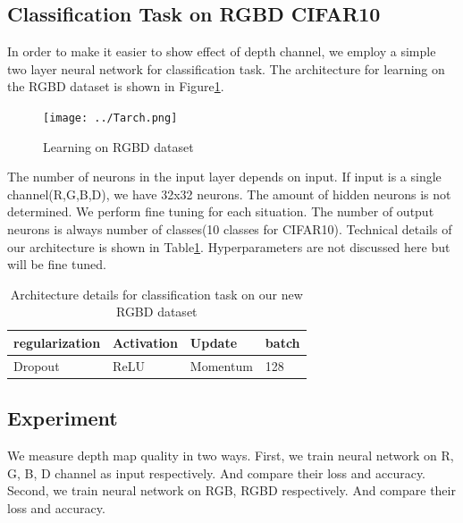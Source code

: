 \documentclass[10pt,twocolumn,letterpaper]{article}
\begin{document}
\subsection{Classification Task on RGBD CIFAR10}
In order to make it easier to show effect of depth channel,
 we employ a simple two layer neural network for classification task.
 The architecture for learning on the RGBD dataset is shown in Figure\ref{fig:tarch}. 
 \begin{figure}
\texttt{[image: ../Tarch.png]}
\caption{Learning on RGBD dataset}
\label{fig:tarch}
\end{figure}
The number of neurons in the input layer depends on input.
If input is a single channel(R,G,B,D), we have 32x32 neurons.
The amount of hidden neurons is not determined. We perform fine tuning 
for each situation. The number of output neurons is always number of classes(10 classes
for CIFAR10). Technical details of our architecture is shown in Table\ref{tab:details}. 
Hyperparameters are not discussed here but will be fine tuned.
\begin{table}
\begin{center}
\begin{tabular}{|l|l|l|l|}
\hline
regularization&Activation&Update&batch\\
\hline
Dropout&ReLU&Momentum&128\\
\hline
\end{tabular}
\end{center}
\caption{Architecture details for classification task on our new RGBD dataset}
\label{tab:details}
\end{table}


\subsection{Experiment}
We measure depth map quality in two ways. 
First, we train neural network on R, G, B, D channel as input respectively.
And compare their loss and accuracy. 
Second, we train neural network on RGB, RGBD respectively. 
And compare their loss and accuracy.
\end{document}

